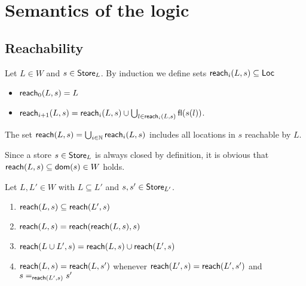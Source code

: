 \documentclass[12pt,a4paper]{report}
\begin{document}
%



\section{Semantics of the logic}



\subsection{Reachability}

\begin{definition}[Reachability]
  Let $L\in W$ and $s\in\mathsf{Store}_L$. By induction we define sets $\mathsf{reach}_{i}(L,s) \subseteq \mathsf{Loc}$
  \begin{itemize}
    \item $\mathsf{reach}_{0}(L,s) = L$
    \item $\mathsf{reach}_{i+1}(L,s) = \mathsf{reach}_{i}(L,s) \cup \bigcup_{l\in\mathsf{reach}_{i}(L,s)} \mathsf{fl}(s(l))$.
  \end{itemize}
  The set $\mathsf{reach}(L,s) = \bigcup_{i\in\mathbb N} \mathsf{reach}_{i}(L,s)$ includes all locations in $s$ reachable
  by $L$.
\end{definition}

Since a store $s\in\mathsf{Store}_L$ is always closed by definition, it is obvious that
$\mathsf{reach}(L,s) \subseteq \mathsf{dom}(s) \in  W$ holds.

\begin{lemma}[Reachability] \label{lemma:Reachability}
  Let $L,L'\in W$ with $L \subseteq L'$ and $s,s'\in\mathsf{Store}_{L'}$.
  \begin{enumerate}
    \item $\mathsf{reach}(L,s) \subseteq \mathsf{reach}(L',s)$
    \item $\mathsf{reach}(L,s) = \mathsf{reach}(\mathsf{reach}(L,s),s)$
    \item $\mathsf{reach}(L \cup L',s) = \mathsf{reach}(L,s) \cup \mathsf{reach}(L',s)$
    \item $\mathsf{reach}(L,s) = \mathsf{reach}(L,s')$ whenever $\mathsf{reach}(L',s) = \mathsf{reach}(L',s')$
          and $s =_{\mathsf{reach}(L',s)} s'$
  \end{enumerate}
\end{lemma}
\end{document}
